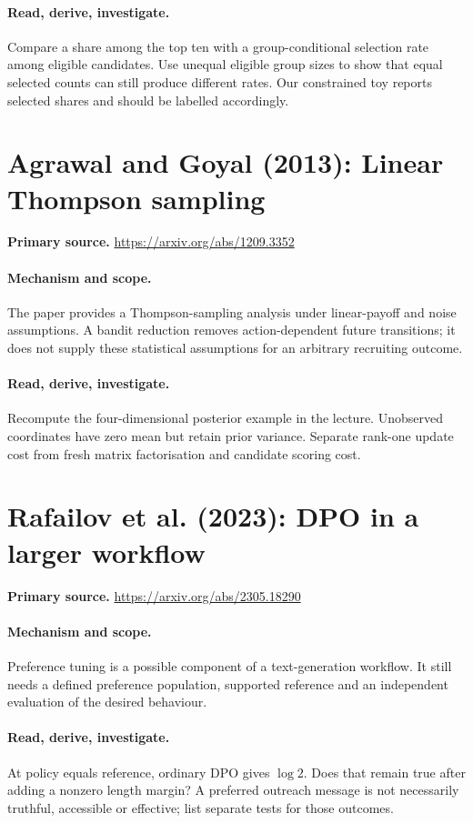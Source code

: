 \documentclass[11pt]{scrartcl}
\begin{document}
\paragraph{Read, derive, investigate.} Compare a share among the top ten with a group-conditional selection rate among eligible candidates. Use unequal eligible group sizes to show that equal selected counts can still produce different rates. Our constrained toy reports selected shares and should be labelled accordingly.

\section{Agrawal and Goyal (2013): Linear Thompson sampling}
\noindent\textbf{Primary source.} \url{https://arxiv.org/abs/1209.3352}

\paragraph{Mechanism and scope.} The paper provides a Thompson-sampling analysis under linear-payoff and noise assumptions. A bandit reduction removes action-dependent future transitions; it does not supply these statistical assumptions for an arbitrary recruiting outcome.

\paragraph{Read, derive, investigate.} Recompute the four-dimensional posterior example in the lecture. Unobserved coordinates have zero mean but retain prior variance. Separate rank-one update cost from fresh matrix factorisation and candidate scoring cost.

\section{Rafailov et al. (2023): DPO in a larger workflow}
\noindent\textbf{Primary source.} \url{https://arxiv.org/abs/2305.18290}

\paragraph{Mechanism and scope.} Preference tuning is a possible component of a text-generation workflow. It still needs a defined preference population, supported reference and an independent evaluation of the desired behaviour.

\paragraph{Read, derive, investigate.} At policy equals reference, ordinary DPO gives $\log2$. Does that remain true after adding a nonzero length margin? A preferred outreach message is not necessarily truthful, accessible or effective; list separate tests for those outcomes.
\end{document}
